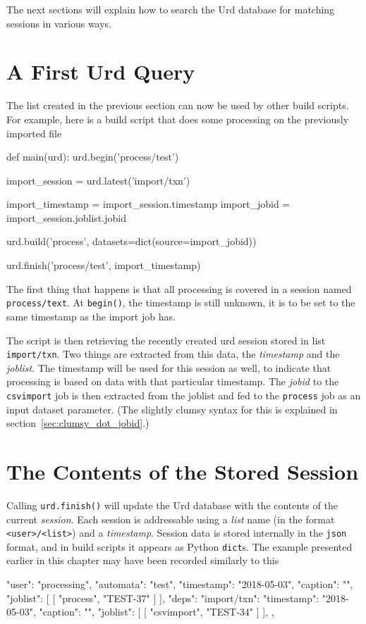 The next sections will explain how to search the Urd database for
matching sessions in various ways.




\section{A First Urd Query}

The list created in the previous section can now be used by other
build scripts.  For example, here is a build script that does some
processing on the previously imported file
\begin{python}
def main(urd):
    urd.begin('process/test')

    import_session = urd.latest('import/txn')

    import_timestamp = import_session.timestamp
    import_jobid     = import_session.joblist.jobid

    urd.build('process', datasets=dict(source=import_jobid))

    urd.finish('process/test', import_timestamp)
\end{python}
The first thing that happens is that all processing is covered in a
session named \texttt{process/text}.  At \texttt{begin()}, the
timestamp is still unknown, it is to be set to the same timestamp as
the import job has.

The script is then retrieving the recently created urd session stored
in list \texttt{import/txn}.  Two things are extracted from this data,
the \textsl{timestamp} and the \textsl{joblist}.  The timestamp will
be used for this session as well, to indicate that processing is based
on data with that particular timestamp.  The \textsl{jobid} to
the \texttt{csvimport} job is then extracted from the joblist and fed
to the \texttt{process} job as an input dataset parameter.  (The
slightly clumsy syntax for this is explained in section~\ref{sec:clumsy_dot_jobid}.)



\section{The Contents of the Stored Session}
\label{sec:urd_item}

Calling \texttt{urd.finish()} will update the Urd database with the
contents of the current \textsl{session}.  Each session is addressable
using a \textsl{list} name (in the format \texttt{<user>/<list>}) and
a \textsl{timestamp}.  Session data is stored internally in
the \texttt{json} format, and in build scripts it appears as
Python \texttt{dict}s.  The example presented earlier in this chapter
may have been recorded similarly to this
\begin{json}
{
    "user": "processing",
    "automata": "test",
    "timestamp": "2018-05-03",
    "caption": "",
    "joblist": [
        [
            "process",
            "TEST-37"
        ]
    ],
    "deps": {
        "import/txn": {
            "timestamp": "2018-05-03",
            "caption": "",
            "joblist": [
                [
                    "csvimport",
                    "TEST-34"
                ]
            ],
        }
    },
}
\end{json}

